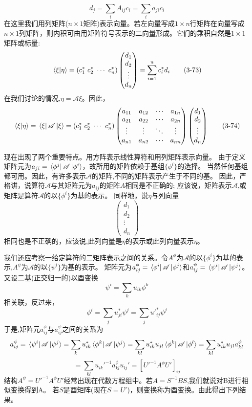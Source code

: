 \[d_j=\sum_iA_{ij}c_i=\sum_ia_{ji}c_i \tag{3-72}\]
在这里我们用列矩阵($n \times 1$矩阵)表示向量。若左向量写成$1 \times n$行矩阵在向量写成$n \times 1$列矩阵，则内积可由用矩阵符号表示的二向量形成。它们的乘积自然是$1 \times 1$矩阵或标量:
\[\bra*{\xi}\ket*{\eta}=\left(c_1^* \ c_2^* \ \cdots \ c_n^*\right)
\begin{pmatrix}
    d_1 \\ d_2 \\ \vdots \\ d_n
\end{pmatrix}
=\sum_{i=1}^nc_i^*d_i \tag{3-73}\]
在我们讨论的情况,$\eta=\mathscr{A}\xi$。因此，
\[\bra*{\xi}\ket*{\eta}=\bra*{\xi}\mathscr{A}\ket*{\xi}=\left(c_1^* \ c_2^* \ \cdots \ c_n^*\right)
\begin{pmatrix}
    a_{11} & a_{12} & \cdots & a_{1n} \\
    a_{21} & a_{22} & \cdots & a_{2n} \\
    \vdots & \vdots & \ddots & \vdots \\
    a_{n1} & a_{n2} & \cdots & a_{nn}
\end{pmatrix}
\begin{pmatrix}
    d_1 \\ d_2 \\ \vdots \\ d_n
\end{pmatrix}
\tag{3-74}\]

现在出现了两个重要特点。用方阵表示线性算符和用列矩阵表示向量。
由于定义矩阵元为$a_{ji}=\bra*{\phi^j}\mathscr{A}\ket*{\phi^i}$，故所用的矩阵依赖于基组$\{\phi^i\}$的选择。
当然任何基组都可用。因此，有许多表示$\mathscr{A}$的矩阵,不同的矩阵表示产生于不同的基。
因此，严格讲，说算符$\mathscr{A}$与其矩阵元为$a_{ij}$的矩阵$A$相同是不正确的;
应该说，矩阵表示$\mathscr{A}$,或矩阵是算符$\mathscr{A}$的以$\{\phi^i\}$为基的表示。
同样地，说$\eta$与列向量
\[
\begin{pmatrix}
    d_1 \\ d_2 \\ \vdots \\ d_n
\end{pmatrix}
\]
相同也是不正确的，应该说,此列向量是$\eta$的表示或此列向量表示$\eta$。

我们还应考察一给定算符的二矩阵表示之间的关系。令$A^{\phi}$为$\mathscr{A}$的以$\{\phi^i\}$为基的表示,$A^{\psi}$为$\mathscr{A}$的以$\{\psi^i\}$为基的表示。
矩阵元为$a_{ij}^{\phi}=\bra*{\phi^i}\mathscr{A}\ket*{\phi^j}$和$a_{ij}^{\psi}=\bra*{\psi^i}\mathscr{A}\ket*{\psi^j}$。又设二基(正交归一的)以酉变换
\[\psi^i=\sum_ku_{ik}\phi^k\]
相关联，反过来，
\[\phi^i=\sum_ju^*_{ji}\psi^j=\sum_ju'^*_{ij}\psi^j\]
于是,矩阵元$a_{ij}^{\phi}$与$a_{ij}^{\psi}$之间的关系为
\[a_{ij}^{\psi}=\bra*{\psi^i}\mathscr{A}\ket*{\psi^j}=\sum_ku^*_{ik}\bra*{\phi^k}\mathscr{A}\ket*{\psi^j}=\sum_{kl}u^*_{ik}u_{jl}\bra*{\phi^k}\mathscr{A}\ket*{\phi^l}=\sum_{kl}u^*_{ik}u_{jl}a_{kl}^{\phi}\]
\[=\sum_{kl}u_{ik}'^{-1}a_{kl}^{\phi}u_{lj}'=[U'^{-1}A^{\phi}U']_{ij} \tag{3-75}\]
结构$A^{\psi}=U'^{-1}A^{\phi}U'$经常出现在代数方程组中。若$A=S^{-1}BS$,我们就说对B进行相似变换得到A。
若$S$是酉矩阵(现在$S=U'$)，则变换称为酉变换。由此得出下列结果。

